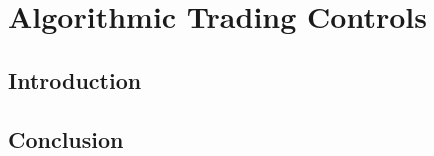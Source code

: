 %


\chapter{Algorithmic Trading Controls}
\label{chap:controls}


\section{Introduction}


\section{Conclusion}
\label{sec:controls:conclusion}

